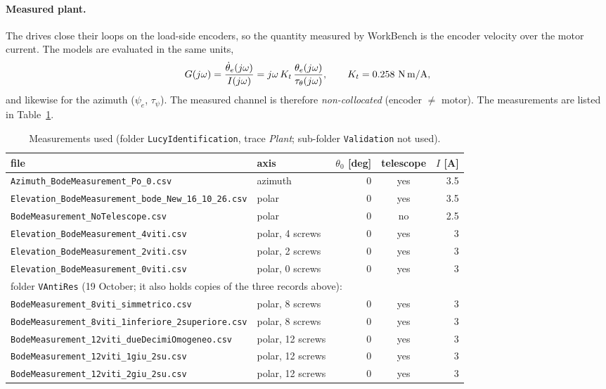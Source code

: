 \documentclass[10pt,a4paper]{article}
\numberwithin{equation}{section}
\begin{document}
\paragraph{Measured plant.} The drives close their loops on the load-side encoders, so the quantity measured by WorkBench is the encoder velocity over the motor current. The models are evaluated in the same units,
\begin{gather}
G(j\omega) = \frac{\dot\theta_e(j\omega)}{I(j\omega)} = j\omega\,K_t\,\frac{\theta_e(j\omega)}{\tau_\theta(j\omega)},\qquad K_t = 0.258\ \text{N\,m/A},\label{eq:plant}
\end{gather}
and likewise for the azimuth ($\psi_e$, $\tau_\psi$). The measured channel is therefore \emph{non-collocated} (encoder $\ne$ motor). The measurements are listed in Table~\ref{tab:meas}.
\begin{table}[H]\centering\small
\caption{Measurements used (folder \texttt{LucyIdentification}, trace \emph{Plant}; sub-folder \texttt{Validation} not used).}\label{tab:meas}
\begin{tabular}{llrcr}\toprule
file & axis & $\theta_0$ [deg] & telescope & $I$ [A] \\ \midrule
\texttt{Azimuth\_BodeMeasurement\_Po\_0.csv} & azimuth & 0 & yes & 3.5 \\
\texttt{Elevation\_BodeMeasurement\_bode\_New\_16\_10\_26.csv} & polar & 0 & yes & 3.5 \\
\texttt{BodeMeasurement\_NoTelescope.csv} & polar & 0 & no & 2.5 \\ \midrule
\texttt{Elevation\_BodeMeasurement\_4viti.csv} & polar, 4 screws & 0 & yes & 3 \\
\texttt{Elevation\_BodeMeasurement\_2viti.csv} & polar, 2 screws & 0 & yes & 3 \\
\texttt{Elevation\_BodeMeasurement\_0viti.csv} & polar, 0 screws & 0 & yes & 3 \\ \midrule
\multicolumn{5}{l}{\footnotesize folder \texttt{VAntiRes} (19 October; it also holds copies of the three records above):}\\
\texttt{BodeMeasurement\_8viti\_simmetrico.csv} & polar, 8 screws & 0 & yes & 3 \\
\texttt{BodeMeasurement\_8viti\_1inferiore\_2superiore.csv} & polar, 8 screws & 0 & yes & 3 \\
\texttt{BodeMeasurement\_12viti\_dueDecimiOmogeneo.csv} & polar, 12 screws & 0 & yes & 3 \\
\texttt{BodeMeasurement\_12viti\_1giu\_2su.csv} & polar, 12 screws & 0 & yes & 3 \\
\texttt{BodeMeasurement\_12viti\_2giu\_2su.csv} & polar, 12 screws & 0 & yes & 3 \\ \bottomrule
\end{tabular}\end{table}
\end{document}
